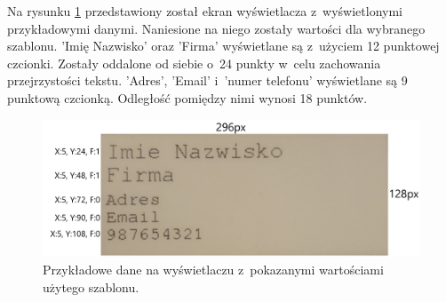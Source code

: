 \documentclass[a4paper,12pt, twoside]{article}
\begin{document}
    	Na rysunku \ref{fig:sampleLayout} przedstawiony został ekran wyświetlacza z~wyświetlonymi przykładowymi danymi. Naniesione na niego zostały wartości dla wybranego szablonu. 'Imię Nazwisko' oraz  'Firma' wyświetlane są z~użyciem 12 punktowej czcionki. Zostały oddalone od siebie o~24 punkty w~celu zachowania przejrzystości tekstu. 'Adres', 'Email' i~'numer telefonu' wyświetlane są 9 punktową czcionką. Odległość pomiędzy nimi wynosi 18 punktów. 
    	\begin{figure}[H]
    	        \centering
    			\includegraphics[width=13cm]{images/wygladlayout.png}
    			\caption{Przykładowe dane na wyświetlaczu z~pokazanymi wartościami użytego szablonu.}
                \label{fig:sampleLayout}
    	\end{figure}
    	
        \newpage
\end{document}
